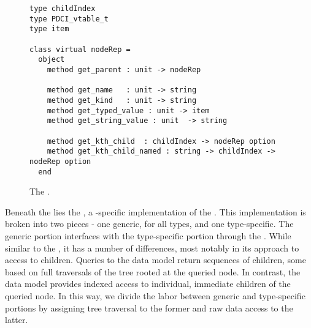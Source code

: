 






\begin{figure*}
{\small
\begin{verbatim}
type childIndex
type PDCI_vtable_t
type item

class virtual nodeRep = 
  object 
    method get_parent : unit -> nodeRep

    method get_name   : unit -> string
    method get_kind   : unit -> string
    method get_typed_value : unit -> item
    method get_string_value : unit  -> string

    method get_kth_child  : childIndex -> nodeRep option
    method get_kth_child_named : string -> childIndex -> nodeRep option
  end
\end{verbatim}
}
\caption{The \padx{} \absdm.}
\label{fig:padx-absdm}
\end{figure*}

Beneath the \galax \absdm lies the \padx{} \condm, a \padx{}-specific
implementation of the \galax \absdm. This implementation is broken
into two pieces - one generic, for all \pads types, and one
type-specific. The generic portion interfaces with the type-specific
portion through the \padx \absdm.  While similar to the \galax{}
\absdm, it has a number of differences, most notably in its approach
to access to children.  Queries to the \galax data model return
sequences of children, some based on full traversals of the tree
rooted at the queried node. In contrast, the \padx{} data model
provides indexed access to individual, immediate children of the
queried node. In this way, we divide the labor between generic and
type-specific portions by assigning tree traversal to the former and
raw data access to the latter.

